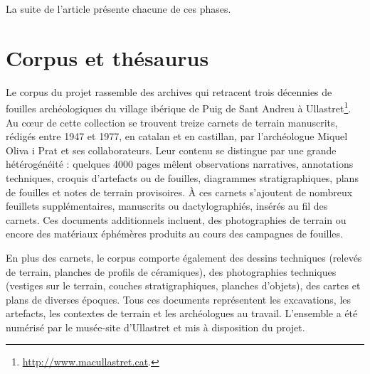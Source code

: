 \documentclass[final, fra]{anthology-ch}     %
\begin{document}
La suite de l'article présente chacune de ces phases.

\section{Corpus et thésaurus} 
\label{sect:corpus}

Le corpus du projet rassemble des archives qui retracent trois décennies de fouilles archéologiques du village ibérique de Puig de Sant Andreu à Ullastret\footnote{\url{http://www.macullastret.cat}.}. Au cœur de cette collection se trouvent treize carnets de terrain manuscrits, rédigés entre 1947 et 1977, en catalan et en castillan, par l'archéologue Miquel Oliva i Prat et ses collaborateurs. Leur contenu se distingue par une grande hétérogénéité : quelques 4000 pages mêlent observations narratives, annotations techniques, croquis d’artefacts ou de fouilles, diagrammes stratigraphiques, plans de fouilles et notes de terrain provisoires. À ces carnets s’ajoutent de nombreux feuillets supplémentaires, manuscrits ou dactylographiés, insérés au fil des carnets. Ces documents additionnels incluent, des photographies de terrain ou encore des matériaux éphémères produits au cours des campagnes de fouilles.

En plus des carnets, le corpus comporte également des dessins techniques (relevés de terrain, planches de profils de céramiques), des photographies techniques (vestiges sur le terrain, couches stratigraphiques, planches d’objets), des cartes et plans de diverses époques. Tous ces documents représentent les excavations, les artefacts, les contextes de terrain et les archéologues au travail. L'ensemble a été numérisé par le musée-site d'Ullastret et mis à disposition du projet. 
\end{document}
